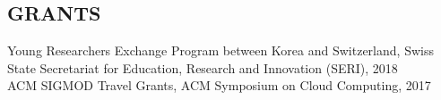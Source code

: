 \documentclass[margin]{res}
\begin{document}
\begin{resume}

\vspace{-0.2em}
\section{GRANTS}
\par
Young Researchers Exchange Program between Korea and Switzerland, Swiss State Secretariat for Education, Research and Innovation (SERI), 2018 \\

\vspace{-2.0em}
ACM SIGMOD Travel Grants, ACM Symposium on Cloud Computing, 2017


\vspace{-0.2em}

\end{resume}
\end{document}
